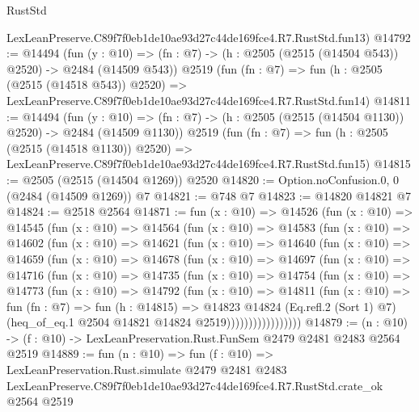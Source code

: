 \begin{lexlean}{RustStd}
\begin{coremodule}
    LexLeanPreserve.C89f7f0eb1de10ae93d27c44de169fce4.R7.RustStd.fun13)
@14792 := @14494
    (fun (y : @10) => (fn : @7) -> (h : @2505 (@2515 (@14504 @543)) @2520) -> @2484 (@14509 @543))
    @2519
    (fun (fn : @7) =>
    fun (h : @2505 (@2515 (@14518 @543)) @2520) =>
    LexLeanPreserve.C89f7f0eb1de10ae93d27c44de169fce4.R7.RustStd.fun14)
@14811 := @14494
    (fun (y : @10) => (fn : @7) -> (h : @2505 (@2515 (@14504 @1130)) @2520) -> @2484 (@14509 @1130))
    @2519
    (fun (fn : @7) =>
    fun (h : @2505 (@2515 (@14518 @1130)) @2520) =>
    LexLeanPreserve.C89f7f0eb1de10ae93d27c44de169fce4.R7.RustStd.fun15)
@14815 := @2505 (@2515 (@14504 @1269)) @2520
@14820 := Option.noConfusion.{0, 0} (@2484 (@14509 @1269)) @7
@14821 := @748 @7
@14823 := @14820 @14821 @7
@14824 := @2518 @2564
@14871 := fun (x : @10) =>
  @14526
    (fun (x : @10) =>
    @14545
      (fun (x : @10) =>
      @14564
        (fun (x : @10) =>
        @14583
          (fun (x : @10) =>
          @14602
            (fun (x : @10) =>
            @14621
              (fun (x : @10) =>
              @14640
                (fun (x : @10) =>
                @14659
                  (fun (x : @10) =>
                  @14678
                    (fun (x : @10) =>
                    @14697
                      (fun (x : @10) =>
                      @14716
                        (fun (x : @10) =>
                        @14735
                          (fun (x : @10) =>
                          @14754
                            (fun (x : @10) =>
                            @14773
                              (fun (x : @10) =>
                              @14792
                                (fun (x : @10) =>
                                @14811
                                  (fun (x : @10) =>
                                  fun (fn : @7) =>
                                  fun (h : @14815) =>
                                  @14823
                                    @14824
                                    (Eq.refl.{2} (Sort 1) @7)
                                    (heq_of_eq.{1} @2504 @14821 @14824 @2519)))))))))))))))))
@14879 := (n : @10) -> (f : @10) -> LexLeanPreservation.Rust.FunSem @2479 @2481 @2483 @2564 @2519
@14889 := fun (n : @10) =>
  fun (f : @10) =>
  LexLeanPreservation.Rust.simulate
    @2479
    @2481
    @2483
    LexLeanPreserve.C89f7f0eb1de10ae93d27c44de169fce4.R7.RustStd.crate_ok
    @2564
    @2519
\end{coremodule}
\end{lexlean}
